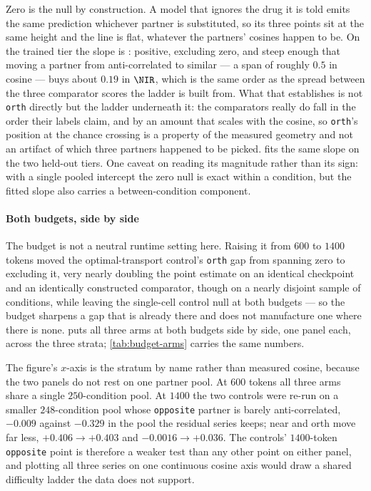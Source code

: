 Zero is the null by construction. A model that ignores the drug it is told
emits the same prediction whichever partner is substituted, so its three points
sit at the same height and the line is flat, whatever the partners' cosines
happen to be. On the trained tier the slope is :
positive, excluding zero, and steep enough that moving a partner from
anti-correlated to similar --- a span of roughly $0.5$ in cosine --- buys about
$0.19$ in $\NIR$, which is the same order as the spread between the three
comparator scores the ladder is built from. What that establishes is not
\texttt{orth} directly but the ladder underneath it: the comparators really do
fall in the order their labels claim, and by an amount that scales with the
cosine, so \texttt{orth}'s position at the chance crossing is a property of the
measured geometry and not an artifact of which three partners happened to be
picked.  fits the same slope on the two held-out
tiers. One caveat on reading its magnitude rather than its sign: with a single
pooled intercept the zero null is exact within a condition, but the fitted slope
also carries a between-condition component.


\paragraph{Both budgets, side by side} The budget is not a neutral runtime
setting here. Raising it from $600$ to $1400$ tokens moved the
optimal-transport control's \texttt{orth} gap from spanning zero to excluding
it, very nearly doubling the point estimate on an identical checkpoint and an
identically constructed comparator, though on a nearly disjoint sample of
conditions, while leaving the single-cell control null at both budgets --- so
the budget sharpens a gap that is already there and does not manufacture one
where there is none.  puts all three arms at both budgets side
by side, one panel each, across the three strata;
\cref{tab:budget-arms} carries the same numbers.

The figure's $x$-axis is the stratum by name rather than measured cosine,
because the two panels do not rest on one partner pool. At $600$ tokens all
three arms share a single $\num{250}$-condition pool. At $1400$ the two controls
were re-run on a smaller $\num{248}$-condition pool whose \texttt{opposite}
partner is barely anti-correlated, $-0.009$ against $-0.329$ in the pool the
residual series keeps; near and orth move far less, $+0.406\rightarrow+0.403$
and $-0.0016\rightarrow+0.036$. The controls' $1400$-token \texttt{opposite}
point is therefore a weaker test than any other point on either panel, and
plotting all three series on one continuous cosine axis would draw a shared
difficulty ladder the data does not support.


